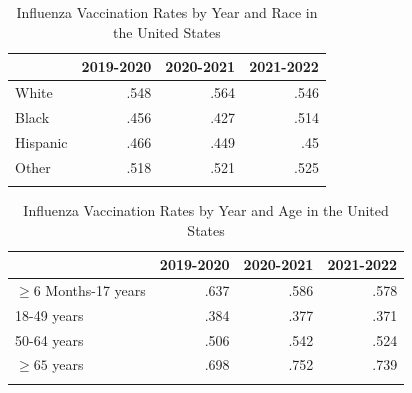 \documentclass[12pt]{article}
\begin{document}
\begin{table}[h!]
    \centering
    \caption{Influenza Vaccination Rates by Year and Race in the United States}
    \label{tab:table:proporitonsrace}
     \begin{tabularx}{.8\textwidth}{X rrr}
      \lsptoprule
                & 2019-2020 & 2020-2021  & 2021-2022\\
      \midrule
      White  &   .548  &    .564  &    .546\\
      Black  &   .456  &    .427  &    .514\\
      Hispanic  &   .466  &    .449  &   .45\\
      Other  &   .518  &    .521  &    .525\\
      \lspbottomrule
     \end{tabularx}
    \end{table}

\begin{table}[h!]
    \centering
    \caption{Influenza Vaccination Rates by Year and Age in the United States}
    \label{tab:table:proporitonsage}
     \begin{tabularx}{.8\textwidth}{X rrr}
      \lsptoprule
                & 2019-2020 & 2020-2021  & 2021-2022\\
      \midrule
      $\ge6$ Months-17 years  &   .637  &    .586  &    .578\\
      18-49 years  &   .384  &    .377  &    .371\\
      50-64 years &   .506  &    .542  &    .524\\
      $\ge 65$ years  &   .698  &    .752 &   .739\\
      \lspbottomrule
     \end{tabularx}
    \end{table}
\end{document}
